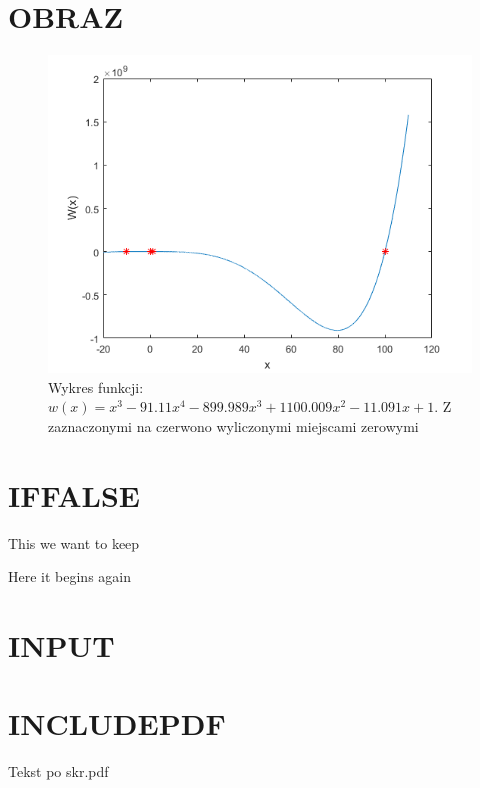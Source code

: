 \documentclass[11pt,a4paper]{article}
\begin{document}
\section*{OBRAZ}
\begin{figure}[H]
	\centering
	\includegraphics[width=13cm]{obrazDo_Szablonu.png}
	\caption{Wykres funkcji: $w(x)=x^3-91.11x^4-899.989x^3+1100.009x^2-11.091x+1$. Z zaznaczonymi na czerwono wyliczonymi  miejscami zerowymi}
\end{figure}

\section*{IFFALSE}
This we want to keep

%

Here it begins again 

\section*{INPUT}

\section*{INCLUDEPDF}

Tekst po skr.pdf
\end{document}
